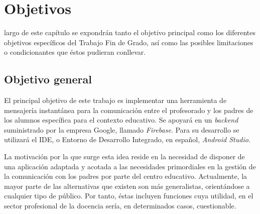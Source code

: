 \chapter{Objetivos}
\label{chap:objetivos}

\noindent

%

 largo de este capítulo se expondrán tanto el objetivo principal como los diferentes objetivos específicos del Trabajo Fin de Grado, así como las posibles limitaciones o condicionantes que éstos pudieran conllevar.

\section{Objetivo general}


El principal objetivo de este trabajo es implementar una herramienta de mensajería instantánea para la comunicación entre el profesorado y los padres de los alumnos específica para el contexto educativo. Se apoyará en un \textit{backend} suministrado por la empresa Google, llamado \textit{Firebase}. Para su desarrollo se utilizará el \acf{IDE}, o Entorno de Desarrollo Integrado, en español, \textit{Android Studio}.

La motivación por la que surge esta idea reside en la necesidad de disponer de una aplicación adaptada y acotada a las necesidades primordiales en la gestión de la comunicación con los padres por parte del centro educativo. Actualmente, la mayor parte de las alternativas que existen son más generalistas, orientándose a cualquier tipo de público. Por tanto, éstas incluyen funciones cuya utilidad, en el sector profesional de la docencia sería, en determinados casos, cuestionable.

